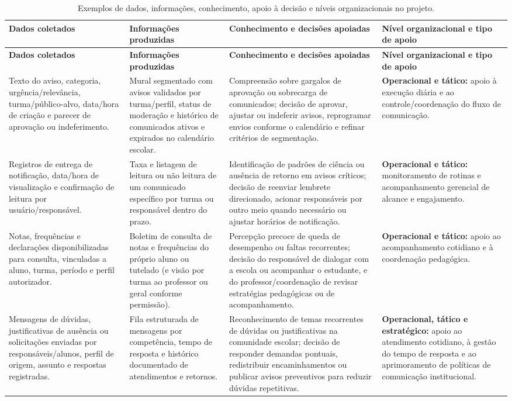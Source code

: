 \documentclass[a4paper,12pt]{report}
\begin{document}
\begin{longtable}{|p{3.0cm}|p{3.3cm}|p{3.4cm}|p{4.9cm}|}
\caption{Exemplos de dados, informações, conhecimento, apoio à decisão e níveis organizacionais no projeto.} \label{tab:dicd} \\
\hline
\textbf{Dados coletados} & \textbf{Informações produzidas} & \textbf{Conhecimento e decisões apoiadas} & \textbf{Nível organizacional e tipo de apoio} \\
\hline
\endfirsthead
\hline
\textbf{Dados coletados} & \textbf{Informações produzidas} & \textbf{Conhecimento e decisões apoiadas} & \textbf{Nível organizacional e tipo de apoio} \\
\hline
\endhead
Texto do aviso, categoria, urgência/relevância, turma/público-alvo, data/hora de criação e parecer de aprovação ou indeferimento. & Mural segmentado com avisos validados por turma/perfil, status de moderação e histórico de comunicados ativos e expirados no calendário escolar. & Compreensão sobre gargalos de aprovação ou sobrecarga de comunicados; decisão de aprovar, ajustar ou indeferir avisos, reprogramar envios conforme o calendário e refinar critérios de segmentação. & \textbf{Operacional e tático:} apoio à execução diária e ao controle/coordenação do fluxo de comunicação. \\
\hline
Registros de entrega de notificação, data/hora de visualização e confirmação de leitura por usuário/responsável. & Taxa e listagem de leitura ou não leitura de um comunicado específico por turma ou responsável dentro do prazo. & Identificação de padrões de ciência ou ausência de retorno em avisos críticos; decisão de reenviar lembrete direcionado, acionar responsáveis por outro meio quando necessário ou ajustar horários de notificação. & \textbf{Operacional e tático:} monitoramento de rotinas e acompanhamento gerencial de alcance e engajamento. \\
\hline
Notas, frequências e declarações disponibilizadas para consulta, vinculadas a aluno, turma, período e perfil autorizador. & Boletim de consulta de notas e frequências do próprio aluno ou tutelado (e visão por turma ao professor ou geral conforme permissão). & Percepção precoce de queda de desempenho ou faltas recorrentes; decisão do responsável de dialogar com a escola ou acompanhar o estudante, e do professor/coordenação de revisar estratégias pedagógicas ou de acompanhamento. & \textbf{Operacional e tático:} apoio ao acompanhamento cotidiano e à coordenação pedagógica. \\
\hline
Mensagens de dúvidas, justificativas de ausência ou solicitações enviadas por responsáveis/alunos, perfil de origem, assunto e respostas registradas. & Fila estruturada de mensagens por competência, tempo de resposta e histórico documentado de atendimentos e retornos. & Reconhecimento de temas recorrentes de dúvidas ou justificativas na comunidade escolar; decisão de responder demandas pontuais, redistribuir encaminhamentos ou publicar avisos preventivos para reduzir dúvidas repetitivas. & \textbf{Operacional, tático e estratégico:} apoio ao atendimento cotidiano, à gestão do tempo de resposta e ao aprimoramento de políticas de comunicação institucional. \\
\hline
\end{longtable}
\end{document}
